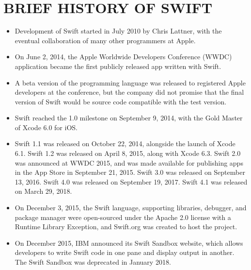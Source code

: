 \documentclass{article}
\begin{document}
\section*{BRIEF HISTORY OF SWIFT}
\begin{itemize}
	\item Development of Swift started in July 2010 by Chris Lattner, with the eventual collaboration of many other programmers at Apple.
	\item On June 2, 2014, the Apple Worldwide Developers Conference (WWDC) application became the first publicly released app written with Swift.
	\item A beta version of the programming language was released to registered Apple developers at the conference, but the company did not promise that the final version of Swift would be source code compatible with the test version.
	\item Swift reached the 1.0 milestone on September 9, 2014, with the Gold Master of Xcode 6.0 for iOS.
	\item Swift 1.1 was released on October 22, 2014, alongside the launch of Xcode 6.1. Swift 1.2 was released on April 8, 2015, along with Xcode 6.3. Swift 2.0 was announced at WWDC 2015, and was made available for publishing apps in the App Store in September 21, 2015. Swift 3.0 was released on September 13, 2016. Swift 4.0 was released on September 19, 2017. Swift 4.1 was released on March 29, 2018.
	\item On December 3, 2015, the Swift language, supporting libraries, debugger, and package manager were open-sourced under the Apache 2.0 license with a Runtime Library Exception, and Swift.org was created to host the project.
	\item On December 2015, IBM announced its Swift Sandbox website, which allows developers to write Swift code in one pane and display output in another. The Swift Sandbox was deprecated in January 2018.
\end{itemize}
\newpage
\end{document}
